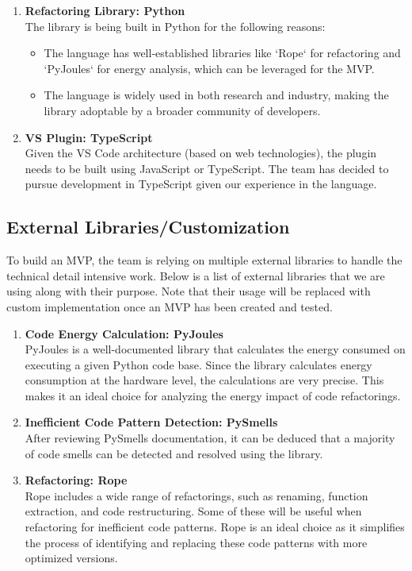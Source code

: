 \documentclass{article}
\begin{document}
\begin{enumerate}
  \item \textbf{Refactoring Library: Python}\\
    The library is being built in Python for the following reasons:
    \begin{itemize}
      \item The language has well-established libraries like `Rope`
        for refactoring and `PyJoules` for energy analysis, which can
        be leveraged for the MVP.
      \item The language is widely used in both research and
        industry, making the library adoptable by a broader community
        of developers.
    \end{itemize}
  \item \textbf{VS Plugin: TypeScript}\\
    Given the VS Code architecture (based on web technologies), the
    plugin needs to be built using JavaScript or TypeScript. The team
    has decided to pursue development in TypeScript given our
    experience in the language.
\end{enumerate}

\subsection{External Libraries/Customization}
To build an MVP, the team is relying on multiple external libraries
to handle the technical detail intensive work. Below is a list of
external libraries that we are using along with their purpose. Note
that their usage will be replaced with custom implementation once an
MVP has been created and tested.

\begin{enumerate}
  \item \textbf{Code Energy Calculation: PyJoules}\\
    PyJoules is a well-documented library that calculates the energy
    consumed on executing a given Python code base. Since the library
    calculates energy consumption at the hardware level, the
    calculations are very precise. This makes it an ideal choice for
    analyzing the energy impact of code refactorings.

  \item \textbf{Inefficient Code Pattern Detection: PySmells}\\
    After reviewing PySmells documentation, it can be deduced that a
    majority of code smells can be detected and resolved using the library.

  \item \textbf{Refactoring: Rope}\\
    Rope includes a wide range of refactorings, such as renaming,
    function extraction, and code restructuring. Some of these will
    be useful when refactoring for inefficient code patterns. Rope is
    an ideal choice as it simplifies the process of identifying and
    replacing these code patterns with more optimized versions.
\end{enumerate}
\end{document}
